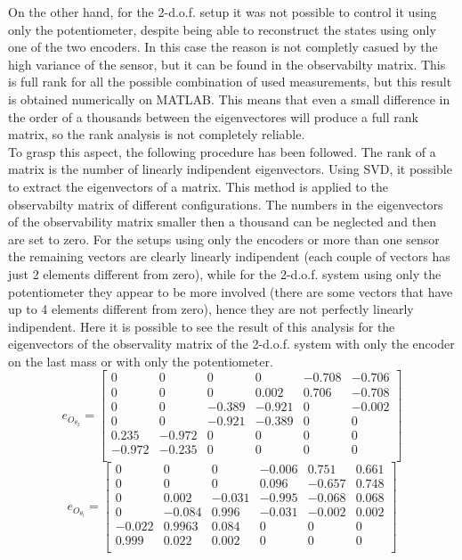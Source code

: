 On the other hand, for the 2-d.o.f. setup it was not possible to control it using only the potentiometer, despite being able to reconstruct the states using only one of the two encoders.
In this case the reason is not completly casued by the high variance of the sensor, but it can be found in the observabilty matrix. This is full rank for all the possible combination of used measurements, but this result is obtained numerically on MATLAB. This means that even a small difference in the order of a thousands between the eigenvectores will produce a full rank matrix, so the rank analysis is not completely reliable. \\ 
To grasp this aspect, the following procedure has been followed. The rank of a matrix is the number of linearly indipendent eigenvectors.
Using SVD, it possible to extract the eigenvectors of a matrix. This method is applied to the observabilty matrix of different configurations. The numbers in the eigenvectors of the observability matrix smaller then a thousand can be neglected and then are set to zero. For the setups using only the encoders or more than one sensor the remaining vectors are clearly linearly indipendent (each couple of vectors has just 2 elements different from zero), while for the 2-d.o.f. system using only the potentiometer they appear to be more involved (there are some vectors that have up to 4 elements different from zero), hence they are not perfectly linearly indipendent.
Here it is possible to see the result of this analysis for the eigenvectors of the observality matrix of the 2-d.o.f. system with only the encoder on the last mass or with only the potentiometer. 
\begin{equation}
	e_{O_{\theta_{2}}}= \begin{bmatrix}
		0& 0 & 0 & 0 		& -0.708 & -0.706 \\
		0& 0 & 0 & 0.002 &  0.706 & -0.708 \\
		0& 0 & -0.389 & -0.921 & 0 & -0.002 \\
		0& 0 & -0.921 & -0.389 & 0 & 0 \\
		0.235 & -0.972 & 0 & 0 & 0 & 0 \\
		-0.972 & -0.235 & 0 & 0 & 0 & 0 \\
	\end{bmatrix}
\end{equation}
\begin{equation}
	e_{O_{\theta_{l}}}= \begin{bmatrix}
		0& 0 & 0 & -0.006  & 0.751 & 0.661 \\
		0& 0 & 0 & 0.096 &  -0.657 & 0.748 \\
		0& 0.002 & -0.031 & -0.995 & -0.068 & 0.068 \\
		0& -0.084 & 0.996 & -0.031 & -0.002& 0.002 \\
		-0.022 & 0.9963 & 0.084 & 0 & 0 & 0 \\
		0.999 & 0.022 & 0.002 & 0 & 0 & 0 \\
	\end{bmatrix}
\end{equation}